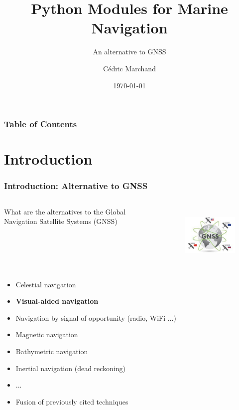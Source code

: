 \documentclass{beamer}
\title[Python navigation] %
{Python Modules for Marine Navigation}
\subtitle{An alternative to GNSS}
\author[Cédric MARCHAND] %
{Cédric Marchand}
\institute[Lab-STICC] %
{
  Lab-STICC, Université de Bretagne Sud
}
\date[\today] {\today}
\begin{document}
\frame{\titlepage}


\begin{frame}
\frametitle{Table of Contents}
\tableofcontents
\end{frame}



\section{Introduction}

\begin{frame}
\frametitle{Introduction: Alternative to GNSS}
    \begin{columns}
        What are the alternatives to the Global Navigation Satellite Systems (GNSS)
        \begin{figure}[h]
        \centering
        \includegraphics[height=3cm]{./pictures/GNSS.jpeg}
        \end{figure}
    \end{columns}
    
    \begin{itemize}
        \item Celestial navigation
        \item \textbf{Visual-aided navigation}
        \item Navigation by signal of opportunity (radio, WiFi ...)
        \item Magnetic navigation
        \item Bathymetric navigation
        \item Inertial navigation (dead reckoning)
        \item ...
        \item Fusion of previously cited techniques
    \end{itemize}
\end{frame}
\end{document}
